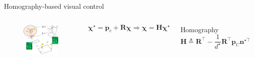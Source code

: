 \documentclass{beamer}
\begin{document}
\begin{frame}{Homography-based visual control}
\begin{columns}
	\begin{figure}
		\includegraphics[width = 63mm]{Images/Notation_rot_modif4.png}
	\end{figure}\vspace{-0.5cm}
	$$\mathbf{\chi}^\star = \mathbf{p}_c + \mathbf{R}\mathbf{\chi} \Rightarrow \mathbf{\chi} = \mathbf{H}\mathbf{\chi}^\star$$ \vspace{-0.8cm}	
	
	
	\begin{block}{Homography}
		\vspace{-0.3cm}
		\begin{equation*}
		\mathbf{H} \triangleq \mathbf{R}^{\!\top} - \frac{1}{d^\star} \mathbf{R}^{\!\top} \mathbf{p}_C \mathbf{n}^{\star\!\top} 
		\end{equation*}
		\centering
	\end{block}
	

\end{columns}
\end{frame}
\end{document}
